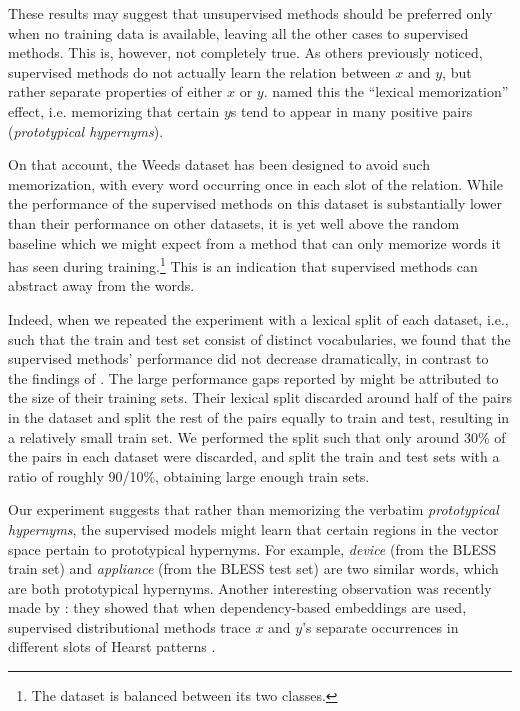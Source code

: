 \documentclass[11pt]{article}
\begin{document}
These results may suggest that unsupervised methods should be preferred only when no training data is available, leaving all the other cases to supervised methods. This is, however, not completely true. As others previously noticed, supervised methods do not actually learn the relation between $x$ and $y$, but rather separate properties of either $x$ or $y$.  named this the ``lexical memorization'' effect, i.e. memorizing that certain $y$s tend to appear in many positive pairs (\emph{prototypical hypernyms}). 

On that account, the Weeds dataset has been designed to avoid such memorization, with every word occurring once in each slot of the relation. 
While the performance of the supervised methods on this dataset is substantially lower than their performance on other datasets, it is yet well above the random baseline which we might expect from a method that can only memorize words it has seen during training.\footnote{The dataset is balanced between its two classes.} This is an indication that supervised methods can abstract away from the words. 

Indeed, when we repeated the experiment with a lexical split of each dataset, i.e., such that the train and test set consist of distinct vocabularies, we found that the supervised methods' performance did not decrease dramatically, in contrast to the findings of . 
The large performance gaps reported by  might be attributed to the size of their training sets. Their lexical split discarded around half of the pairs in the dataset and split the rest of the pairs equally to train and test, resulting in a relatively small train set. We performed the split such that only around 30\% of the pairs in each dataset were discarded, and split the train and test sets with a ratio of roughly 90/10\%, obtaining large enough train sets.

Our experiment suggests that rather than memorizing the verbatim \emph{prototypical hypernyms}, the supervised models might learn that certain regions in the vector space pertain to prototypical hypernyms. For example, \emph{device} (from the BLESS train set) and \emph{appliance} (from the BLESS test set) are two similar words, which are both prototypical hypernyms. Another interesting observation was recently made by : they showed that when dependency-based embeddings are used, supervised distributional methods trace $x$ and $y$'s separate occurrences in different slots of Hearst patterns \cite{hearst1992automatic}.
\end{document}
